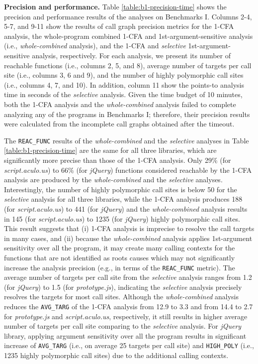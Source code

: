 {\bf Precision and performance.} Table \ref{table:b1-precision-time} shows the precision and performance results of the analyses on Benchmarks I. Columns 2-4, 5-7, and 9-11 show the results of call graph precision metrics for the 1-CFA analysis, the whole-program combined 1-CFA and 1st-argument-sensitive analysis (i.e., {\it whole-combined} analysis), and the 1-CFA and {\it selective} 1st-argument-sensitive analysis, respectively. For each analysis, we present its number of reachable functions (i.e., columns 2, 5, and 8), average number of targets per call site (i.e., columns 3, 6 and 9), and the number of highly polymorphic call sites (i.e., columns 4, 7, and 10). In addition, column 11 show the points-to analysis time in seconds of the {\it selective} analysis. Given the time budget of 10 minutes, both the 1-CFA analysis and the {\it whole-combined} analysis failed to complete analyzing any of the programs in Benchmarks I; therefore, their precision results were calculated from the incomplete call graphs obtained after the timeout.

The {\tt REAC\_FUNC} results of the {\it whole-combined} and the {\it selective} analyses in Table \ref{table:b1-precision-time} are the same for all three libraries, which are significantly more precise than those of the 1-CFA analysis. Only 29\% (for {\it script.aculo.us}) to 66\% (for {\it jQuery}) functions considered reachable by the 1-CFA analysis are produced by the {\it whole-combined} and the {\it selective} analyses. Interestingly, the number of highly polymorphic call sites is below 50 for the {\it selective} analysis for all three libraries, while the 1-CFA analysis produces 188 (for {\it script.aculo.us}) to 441 (for {\it jQuery}) and the {\it whole-combined} analysis results in 145 (for {\it script.aculo.us}) to 1235 (for {\it jQuery}) highly polymorphic call sites. This result suggests that (i) 1-CFA analysis is imprecise to resolve the call targets in many cases, and (ii) because the {\it whole-combined} analysis applies 1st-argument sensitivity over all the program, it may create many calling contexts for the functions that are not identified as roots causes which may not significantly increase the analysis precision (e.g., in terms of the {\tt REAC\_FUNC} metric). The average number of targets per call site from the {\it selective} analysis ranges from 1.2 (for {\it jQuery}) to 1.5 (for {\it prototype.js}), indicating the {\it selective} analysis precisely resolves the targets for most call sites. Although the {\it whole-combined} analysis reduces the {\tt AVG\_TARG} of the 1-CFA analysis from 12.9 to 3.3 and from 14.4 to 2.7 for {\it prototype.js} and {\it script.aculo.us}, respectively, it still results in higher average number of targets per call site comparing to the {\it selective} analysis. For {\it jQuery} library, applying argument sensitivity over all the program results in significant increase of {\tt AVG\_TARG} (i.e., on average 25 targets per call site) and {\tt HIGH\_POLY} (i.e., 1235 highly polymorphic call sites) due to the additional calling contexts.

